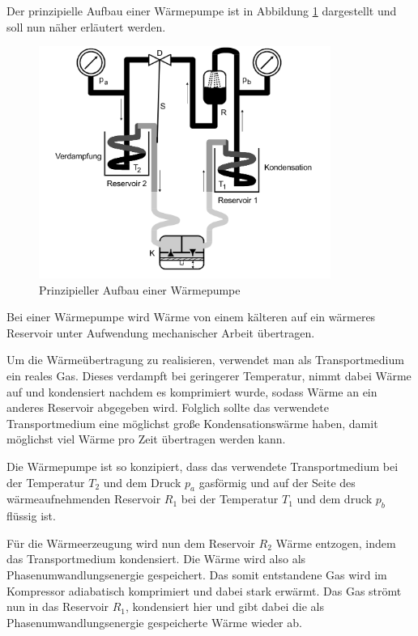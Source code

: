 
\label{sec:Versuchsaufbau}
Der prinzipielle Aufbau einer Wärmepumpe ist in Abbildung \ref{fig:bild1} dargestellt und soll nun näher erläutert werden.

\begin{figure}
  \centering
  \includegraphics[width=0.85\textwidth]{content/aufbau_waermepumpe.png}
  \caption{Prinzipieller Aufbau einer Wärmepumpe \cite{Anleitung}}
  \label{fig:bild1}
\end{figure}

Bei einer Wärmepumpe wird Wärme von einem kälteren auf ein wärmeres Reservoir unter Aufwendung mechanischer Arbeit übertragen.

Um die Wärmeübertragung zu realisieren, verwendet man als Transportmedium ein reales Gas. Dieses verdampft bei geringerer Temperatur, nimmt dabei Wärme auf und kondensiert nachdem es komprimiert wurde, sodass Wärme an ein anderes Reservoir abgegeben wird.
Folglich sollte das verwendete Transportmedium eine möglichst große Kondensationswärme haben, damit möglichst viel Wärme pro Zeit übertragen werden kann.

Die Wärmepumpe ist so konzipiert, dass das verwendete Transportmedium bei der Temperatur $T_2$ und dem Druck $p_a$ gasförmig und auf der Seite des wärmeaufnehmenden Reservoir $R_1$ bei der Temperatur $T_1$ und dem druck $p_b$ flüssig ist.

Für die Wärmeerzeugung wird nun dem Reservoir $R_2$ Wärme entzogen, indem das Transportmedium kondensiert. Die Wärme wird also als Phasenumwandlungsenergie gespeichert.
Das somit entstandene Gas wird im Kompressor adiabatisch komprimiert und dabei stark erwärmt.
Das Gas strömt nun in das Reservoir $R_1$, kondensiert hier und gibt dabei die als Phasenumwandlungsenergie gespeicherte Wärme wieder ab.


